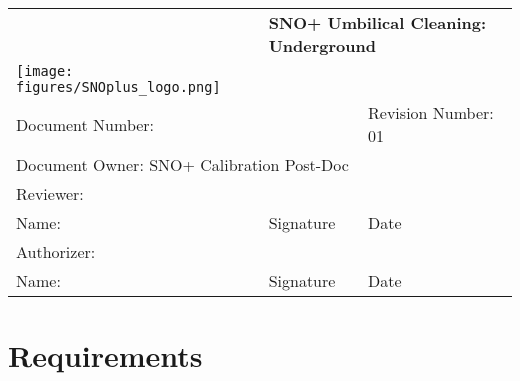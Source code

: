 
\fancyhf{}


\begin{tabular}{||l|l|l||}
\hline\hline
& \multicolumn{2}{p{8cm}||}{\bf SNO+ Umbilical Cleaning: Underground} \\
\texttt{[image: figures/SNOplus\_logo.png]} & \multicolumn{2}{p{8cm}||}{} \\
\hline
\multicolumn{2}{||p{8.5cm}|}{Document Number:} & Revision Number: 01\\
\hline
\multicolumn{3}{||l||}{Document Owner: SNO+ Calibration Post-Doc} \\
\hline
\multicolumn{3}{||l||}{Reviewer:}\\
\hline
Name: & Signature & Date \\
\hline
\multicolumn{3}{||l||}{Authorizer:}\\
\hline
Name: & Signature & Date \\
\hline\hline
\end{tabular}
\thispagestyle{empty}

\newcommand\showcbcounter{\stepcounter{cbcounter}\thecbcounter}

\section{Requirements}

